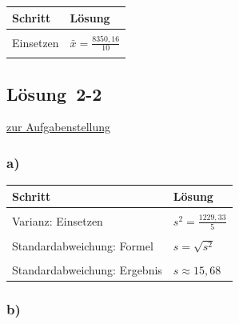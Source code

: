 \documentclass[
  11pt,
  ngerman,
  a4paper,
]{report}
\begin{document}
\begin{table}[H]
\centering
\begin{tabular}{l>{\raggedright\arraybackslash}p{8cm}}
\toprule
\textbf{Schritt} & \textbf{Lösung}\\
\midrule
\cellcolor{gray!6}{Formel} & \cellcolor{gray!6}{$\bar{x}=\frac{\sum\limits_{i=1}^{n}x_{i}}{n}$}\\
Einsetzen & $\bar{x}=\frac{8350{,}16}{10}$\\
\cellcolor{gray!6}{Ergebnis} & \cellcolor{gray!6}{$\bar{x}=835{,}02$}\\
\bottomrule
\end{tabular}
\end{table}

\hypertarget{loesung-2-2}{%
\subsection{Lösung~2-2}\label{loesung-2-2}}

\protect\hyperlink{aufgabe-2-2}{zur Aufgabenstellung}

\hypertarget{a-3}{%
\subsubsection{a)}\label{a-3}}

\begin{table}[H]
\centering
\begin{tabular}{>{\raggedright\arraybackslash}p{8cm}>{\raggedright\arraybackslash}p{8cm}}
\toprule
\textbf{Schritt} & \textbf{Lösung}\\
\midrule
\cellcolor{gray!6}{Varianz: Formel} & \cellcolor{gray!6}{$s^2=\frac{\sum\limits_{i=1}^{n}(x_{i}-\bar{x})^2}{n-1}$}\\
Varianz: Einsetzen & $s^2=\frac{1229{,}33}{5}$\\
\cellcolor{gray!6}{Varianz: Ergebnis} & \cellcolor{gray!6}{$s^2=245{,}87$}\\
Standardabweichung: Formel & $s=\sqrt{s^2}$\\
\cellcolor{gray!6}{Standardabweichung: Einsetzen} & \cellcolor{gray!6}{$s=\sqrt{245{,}87}$}\\
Standardabweichung: Ergebnis & $s\approx15{,}68$\\
\bottomrule
\end{tabular}
\end{table}

\hypertarget{b-3}{%
\subsubsection{b)}\label{b-3}}
\end{document}
